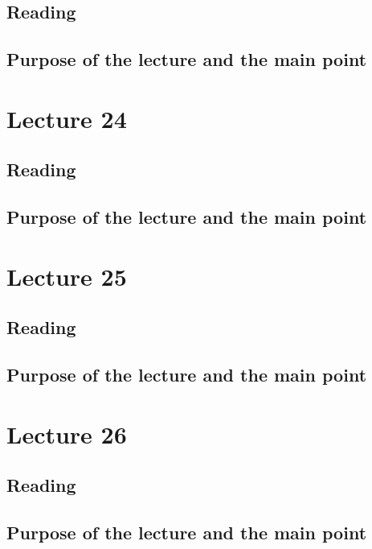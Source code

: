 \subsection{Reading}


\subsection{Purpose of the lecture and the main point}

\section{Lecture 24}




\subsection{Reading}


\subsection{Purpose of the lecture and the main point}

\section{Lecture 25}


\subsection{Reading}


\subsection{Purpose of the lecture and the main point}


\section{Lecture 26}




\subsection{Reading}


\subsection{Purpose of the lecture and the main point}

